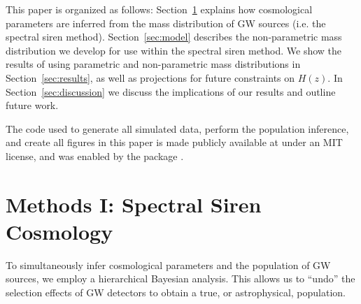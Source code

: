 \documentclass[]{aastex631}
\begin{document}
 

This paper is organized as follows: Section~\ref{sec:ss} explains how cosmological parameters are inferred from the mass distribution of \ac{GW} sources (i.e. the spectral siren method).
Section~\ref{sec:model} describes the non-parametric mass distribution we develop for use within the spectral siren method.
We show the results of using parametric and non-parametric mass distributions in Section~\ref{sec:results}, as well as projections for future constraints on $H(z)$.
In Section~\ref{sec:discussion} we discuss the implications of our results and outline future work.

The code used to generate all simulated data, perform the population inference, and create all figures in this paper is made publicly available at \GitHubURL under an MIT license, and was enabled by the \showyourwork package \citep{Luger2021}.

\section{Methods I: Spectral Siren Cosmology}
\label{sec:ss}

To simultaneously infer cosmological parameters and the population of GW sources, we employ a hierarchical Bayesian analysis.
This allows us to ``undo'' the selection effects of \ac{GW} detectors to obtain a true, or astrophysical, population.
\end{document}
